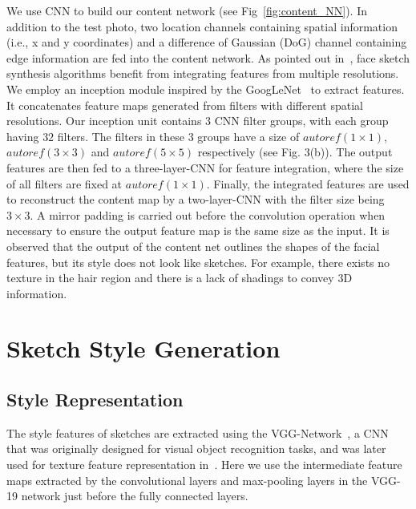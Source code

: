 \documentclass[10pt,twocolumn,letterpaper]{article}
\begin{document}
We use CNN to build our content network (see Fig~\ref{fig:content_NN}). In addition to the test photo, two location channels containing spatial information (i.e., x and y coordinates) and a difference of Gaussian (DoG) channel containing edge information are fed into the content network. As pointed out in~\cite{wang2009face}, face sketch synthesis algorithms benefit from integrating features from multiple resolutions. We employ an inception module inspired by the GoogLeNet~\cite{szegedy2015going} to extract features. It concatenates feature maps generated from filters with different spatial resolutions. Our inception unit contains $3$ CNN filter groups, with each group having $32$ filters. The filters in these 3 groups have a size of $autoref(1\times1)$, $autoref(3\times3)$ and $autoref(5\times5)$ respectively (see Fig. 3(b)). The output features are then fed to a three-layer-CNN for feature integration, where the size of all filters are fixed at $autoref(1\times1)$. Finally, the integrated features are used to reconstruct the content map by a two-layer-CNN with the filter size being $3\times3$. A mirror padding is carried out before the convolution operation when necessary to ensure the output feature map is the same size as the input. It is observed that the output of the content net outlines the shapes of the facial features, but its style does not look like sketches. For example, there exists no texture in the hair region and there is a lack of shadings to convey 3D information.

{
\section{Sketch Style Generation}
}
{
\subsection{Style Representation}
}
The style features of sketches are extracted using the VGG-Network~\cite{simonyan2014very}, a CNN that was originally designed for visual object recognition tasks, and was later used for texture feature representation in~\cite{gatys2015texture}. Here we use the intermediate feature maps extracted by the convolutional layers and max-pooling layers in the VGG-19 network just before the fully connected layers. 
\end{document}
